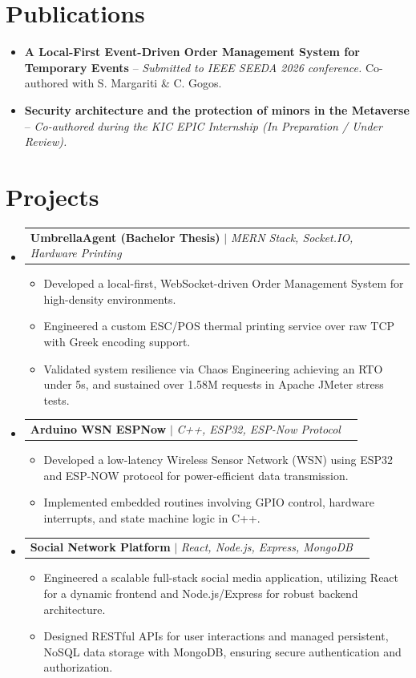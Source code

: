 \documentclass[letterpaper,11pt]{article}
\makeatletter
\newcommand{\resumeItem}[1]{
  \item\small{
    {#1 \vspace{-2pt}}
  }
}
\newcommand{\resumeProjectHeading}[2]{
    \item
    \begin{tabular*}{0.97\textwidth}{l@{\extracolsep{\fill}}r}
      \small#1 & #2 \\
    \end{tabular*}\vspace{-7pt}
}
\newcommand{\resumeSubItem}[1]{\resumeItem{#1}\vspace{-4pt}}
\newcommand{\resumeSubHeadingListStart}{\begin{itemize}[leftmargin=0.15in, label={}]}
\newcommand{\resumeSubHeadingListEnd}{\end{itemize}}
\newcommand{\resumeItemListStart}{\begin{itemize}}
\newcommand{\resumeItemListEnd}{\end{itemize}\vspace{-7pt}}
\makeatother
\begin{document}
\section{Publications}
  \resumeSubHeadingListStart
    \resumeSubItem{\textbf{A Local-First Event-Driven Order Management System for Temporary Events} -- \emph{Submitted to IEEE SEEDA 2026 conference.} Co-authored with S. Margariti \& C. Gogos.}
    \resumeSubItem{\textbf{Security architecture and the protection of minors in the Metaverse} -- \emph{Co-authored during the KIC EPIC Internship (In Preparation / Under Review).}}
  \resumeSubHeadingListEnd

\section{Projects}
    \resumeSubHeadingListStart
      \resumeProjectHeading
          {\textbf{UmbrellaAgent (Bachelor Thesis)} $|$ \emph{MERN Stack, Socket.IO, Hardware Printing}}{}
          \resumeItemListStart
            \resumeItem{Developed a local-first, WebSocket-driven Order Management System for high-density environments.}
            \resumeItem{Engineered a custom ESC/POS thermal printing service over raw TCP with Greek encoding support.}
            \resumeItem{Validated system resilience via Chaos Engineering achieving an RTO under 5s, and sustained over 1.58M requests in Apache JMeter stress tests.}
          \resumeItemListEnd
      \resumeProjectHeading
          {\textbf{Arduino WSN ESPNow} $|$ \emph{C++, ESP32, ESP-Now Protocol}}{}
          \resumeItemListStart
            \resumeItem{Developed a low-latency Wireless Sensor Network (WSN) using ESP32 and ESP-NOW protocol for power-efficient data transmission.}
            \resumeItem{Implemented embedded routines involving GPIO control, hardware interrupts, and state machine logic in C++.}
          \resumeItemListEnd
      \resumeProjectHeading
          {\textbf{Social Network Platform} $|$ \emph{React, Node.js, Express, MongoDB}}{}
          \resumeItemListStart
            \resumeItem{Engineered a scalable full-stack social media application, utilizing React for a dynamic frontend and Node.js/Express for robust backend architecture.}
            \resumeItem{Designed RESTful APIs for user interactions and managed persistent, NoSQL data storage with MongoDB, ensuring secure authentication and authorization.}
          \resumeItemListEnd
    \resumeSubHeadingListEnd

\end{document}
